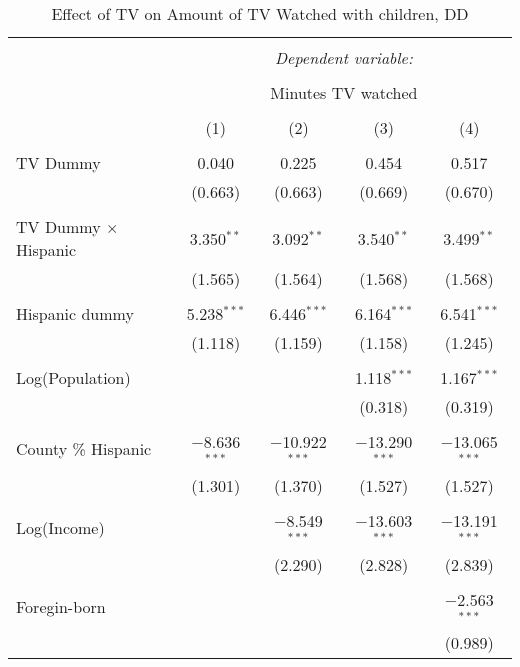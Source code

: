 
\begin{table}[!htbp] \centering 
  \caption{Effect of TV on Amount of TV Watched with children, DD} 
  \label{} 
\begin{tabular}{@{\extracolsep{-5pt}}lcccc} 
\\[-1.8ex]\hline 
\hline \\[-1.8ex] 
 & \multicolumn{4}{c}{\textit{Dependent variable:}} \\ 
\cline{2-5} 
\\[-1.8ex] & \multicolumn{4}{c}{Minutes TV watched} \\ 
\\[-1.8ex] & (1) & (2) & (3) & (4)\\ 
\hline \\[-1.8ex] 
 TV Dummy & 0.040 & 0.225 & 0.454 & 0.517 \\ 
  & (0.663) & (0.663) & (0.669) & (0.670) \\ 
  & & & & \\ 
 TV Dummy $\times$ Hispanic  & 3.350$^{**}$ & 3.092$^{**}$ & 3.540$^{**}$ & 3.499$^{**}$ \\ 
  & (1.565) & (1.564) & (1.568) & (1.568) \\ 
  & & & & \\ 
 Hispanic dummy & 5.238$^{***}$ & 6.446$^{***}$ & 6.164$^{***}$ & 6.541$^{***}$ \\ 
  & (1.118) & (1.159) & (1.158) & (1.245) \\ 
  & & & & \\ 
 Log(Population) &  &  & 1.118$^{***}$ & 1.167$^{***}$ \\ 
  &  &  & (0.318) & (0.319) \\ 
  & & & & \\ 
 County \% Hispanic & $-$8.636$^{***}$ & $-$10.922$^{***}$ & $-$13.290$^{***}$ & $-$13.065$^{***}$ \\ 
  & (1.301) & (1.370) & (1.527) & (1.527) \\ 
  & & & & \\ 
 Log(Income) &  & $-$8.549$^{***}$ & $-$13.603$^{***}$ & $-$13.191$^{***}$ \\ 
  &  & (2.290) & (2.828) & (2.839) \\ 
  & & & & \\ 
 Foregin-born &  &  &  & $-$2.563$^{***}$ \\ 
  &  &  &  & (0.989) \\ 

\end{tabular}
\end{table}
